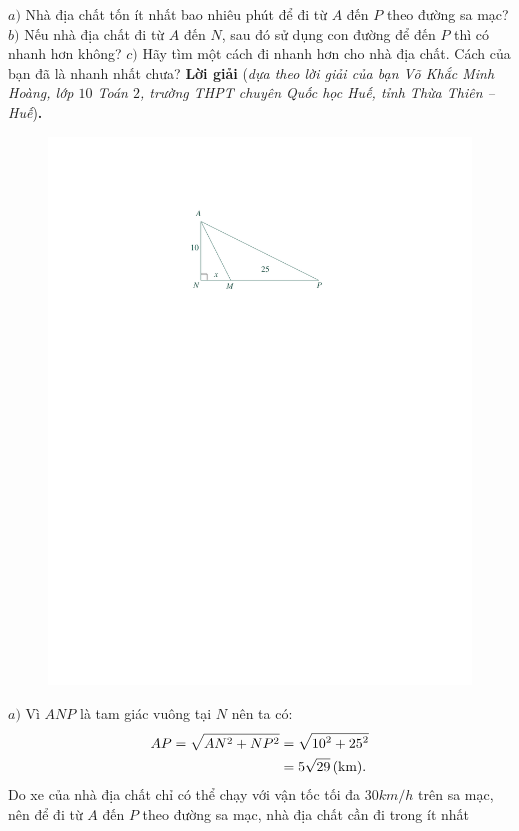 \begin{multicols}{2}
	\vskip 0.05cm
	$a)$ Nhà địa chất tốn ít nhất bao nhiêu phút để đi từ $A$ đến $P$ theo đường sa mạc?
	\vskip 0.05cm
	$b)$ Nếu nhà địa chất đi từ $A$ đến $N$, sau đó sử dụng con đường để đến $P$ thì có nhanh hơn không?
	\vskip 0.05cm
	$c)$ Hãy tìm một cách đi nhanh hơn cho nhà địa chất. Cách của bạn đã là nhanh nhất chưa?
	\vskip 0.05cm
	\textbf{\color{thachthuctoanhoc}Lời giải} (\textit{dựa theo lời giải của bạn Võ Khắc Minh Hoàng, lớp $10$ Toán $2$, trường THPT chuyên Quốc học Huế, tỉnh Thừa Thiên -- Huế})\textbf{\color{thachthuctoanhoc}.}
	\begin{figure}[H]
		\centering
		\vspace*{-10pt}
		\captionsetup{labelformat= empty, justification=centering}
		\includegraphics[width=.8\linewidth]{P597a}
		\vspace*{-10pt}
	\end{figure}
	$a)$ Vì $ANP$ là tam giác vuông tại $N$ nên ta có:
	\begin{align*}
		AP = \sqrt {A{N^2} + N{P^2}}  &= \sqrt {{{10}^2} + {{25}^2}}  \\
		&= 5\sqrt {29} \,({\text{\color{black}km}}).
	\end{align*}
	Do xe của nhà địa chất chỉ có thể chạy với vận tốc tối đa $30km/h$ trên sa mạc, nên để đi từ $A$ đến $P$ theo đường sa mạc, nhà địa chất cần đi trong ít nhất

\end{multicols}
